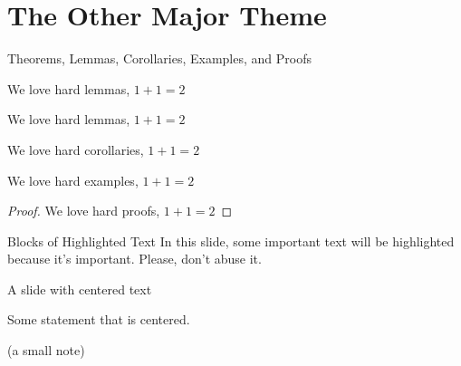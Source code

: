 \section{The Other Major Theme}
\begin{frame}{Theorems, Lemmas, Corollaries, Examples, and Proofs}

\begin{theorem}
We love hard lemmas, $1 + 1 = 2$
\end{theorem}

\begin{lemma}
We love hard lemmas, $1 + 1 = 2$
\end{lemma}

\begin{corollary}
We love hard corollaries, $1 + 1 = 2$
\end{corollary}

\begin{example}
We love hard examples, $1 + 1 = 2$
\end{example}

\begin{proof}
We love hard proofs, $1 + 1 = 2$
\end{proof}

\end{frame}

\begin{frame}{Blocks of Highlighted Text}
In this slide, some important text will be \alert{highlighted} because it's important. Please, don't abuse it. 



\end{frame}

\begin{frame}{A slide with centered text}

  \begin{center}
    Some statement that is centered.
  \end{center}

  \vspace{2ex}
  \begin{center}
    \scriptsize (a small note)
  \end{center}

\end{frame}

